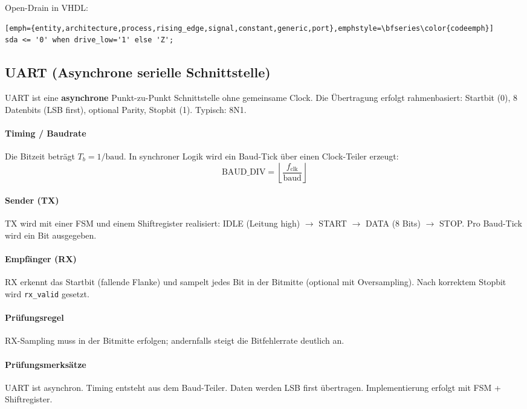 \documentclass[10pt,a4paper]{article}
\begin{document}
\begin{multicols}{3}
Open-Drain in VHDL:
\begin{lstlisting}[emph={entity,architecture,process,rising_edge,signal,constant,generic,port},emphstyle=\bfseries\color{codeemph}][emph={entity,architecture,process,rising_edge,signal,constant,generic,port},emphstyle=\bfseries\color{codeemph}]
sda <= '0' when drive_low='1' else 'Z';
\end{lstlisting}

\subsection{UART (Asynchrone serielle Schnittstelle)}

UART ist eine \textbf{asynchrone} Punkt-zu-Punkt Schnittstelle ohne gemeinsame Clock.
Die Übertragung erfolgt rahmenbasiert:
Startbit (0), 8 Datenbits (LSB first), optional Parity, Stopbit (1). Typisch: 8N1.

\paragraph{Timing / Baudrate}
Die Bitzeit beträgt $T_b = 1/\text{baud}$.
In synchroner Logik wird ein Baud-Tick über einen Clock-Teiler erzeugt:
\[
\text{BAUD\_DIV} = \left\lfloor \frac{f_\text{clk}}{\text{baud}} \right\rfloor
\]

\paragraph{Sender (TX)}
TX wird mit einer FSM und einem Shiftregister realisiert:
IDLE (Leitung high) $\rightarrow$ START $\rightarrow$ DATA (8 Bits) $\rightarrow$ STOP.
Pro Baud-Tick wird ein Bit ausgegeben.

\paragraph{Empfänger (RX)}
RX erkennt das Startbit (fallende Flanke) und sampelt jedes Bit in der Bitmitte
(optional mit Oversampling). Nach korrektem Stopbit wird \texttt{rx\_valid} gesetzt.
\paragraph{Prüfungsregel}
RX-Sampling muss in der Bitmitte erfolgen; andernfalls steigt die Bitfehlerrate deutlich an.

\paragraph{Prüfungsmerksätze}
UART ist asynchron. Timing entsteht aus dem Baud-Teiler.
Daten werden LSB first übertragen.
Implementierung erfolgt mit FSM + Shiftregister.


\end{multicols}
\end{document}
